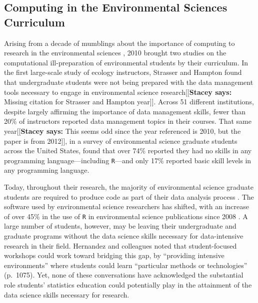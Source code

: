 \documentclass[12pt]{article}
\newcommand{\stacey}[1]{{\color{purple}[[\textbf{Stacey says: }#1]]}}
\begin{document}
\subsection{Computing in the Environmental Sciences Curriculum}

\quad Arising from a decade of mumblings about the importance of computing to 
research in the environmental sciences \citep{andelman, dodds1, dodds2, eglen, 
green, hastings, kelling, wilson-software-carpentry, wilson, wing}, 2010 brought
two studies on the computational ill-preparation of environmental students by
their curriculum. In the first large-scale study of ecology instructors, 
Strasser and Hampton found that undergraduate students were not being prepared
with the data management tools necessary to engage in environmental science
research\stacey{Missing citation for Strasser and Hampton year}. Across 51 different institutions, despite largely affirming the
importance of data management skills, fewer than 20\% of instructors reported
data management topics in their courses. 
That same year\stacey{This seems odd since the year referenced is 2010, but the
paper is from 2012}, in a
survey of environmental science graduate students across the United States,
\citet{hernandez} found that over 74\% reported they had no
skills in any programming language---including \texttt{R}---and only 17\%
reported basic skill levels in any programming language. 

\quad Today, throughout their research, the majority of 
environmental science graduate students are required to produce code as part of
their data analysis process \citep{mislan}. The software used by
environmental science researchers has shifted, with an increase of over 45\%
in the use of \texttt{R} in environmental science publications since 2008
\citep{Rpopular}. A large number of students, however,
may be leaving their undergraduate and graduate programs without the
data science skills necessary for data-intensive research in their field.
Hernandez and colleagues noted that student-focused workshops could
work toward bridging this gap, by ``providing intensive environments'' where
students could learn ``particular methods or technologies'' (p.\ 1075).
Yet, none of these conversations have acknowledged the substantial role students'
statistics education could potentially play in the attainment of the data science
skills necessary for research.

\end{document}
